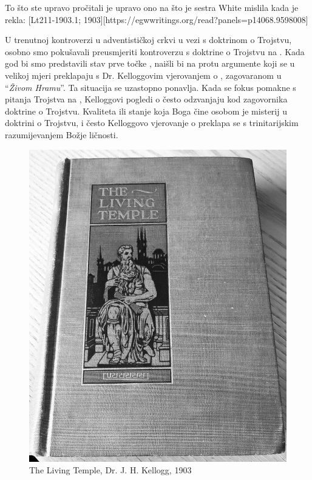 To što ste upravo pročitali je upravo ono na što je sestra White mislila kada je rekla: [Lt211-1903.1; 1903][https://egwwritings.org/read?panels=p14068.9598008]

U trenutnoj kontroverzi u adventističkoj crkvi u vezi s doktrinom o Trojstvu, osobno smo pokušavali preusmjeriti kontroverzu s doktrine o Trojstvu na . Kada god bi smo predstavili stav prve točke , naišli bi na protu argumente koji se u velikoj mjeri preklapaju s Dr. Kelloggovim vjerovanjem o , zagovaranom u “\textit{Živom Hramu}”. Ta situacija se uzastopno ponavlja. Kada se fokus pomakne s pitanja Trojstva na , Kelloggovi pogledi o  često odzvanjaju kod zagovornika doktrine o Trojstvu. Kvaliteta ili stanje koja Boga čine osobom je misterij u doktrini o Trojstvu, i često Kelloggovo vjerovanje o  preklapa se s trinitarijskim razumijevanjem Božje ličnosti.

\begin{figure}[h]
    \centering
    \includegraphics[width=1\linewidth]{images/TLT.jpg}
    \caption*{The Living Temple, Dr. J. H. Kellogg, 1903}
    \label{fig:tlt}
\end{figure}

